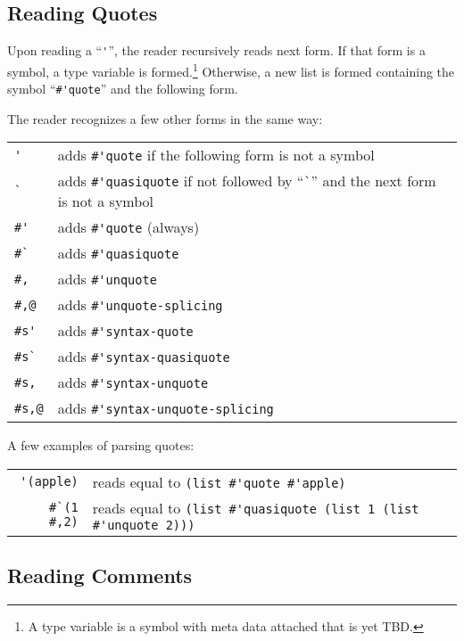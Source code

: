 \subsection{Reading Quotes}
\label{subsec:aml-base-lang-reader-quotes}

Upon reading a ``\lstinline!'!'', the reader recursively reads next form. If that form is a symbol, a type variable is formed.\footnote{A type variable is a symbol with meta data attached that is yet TBD.} Otherwise, a new list is formed containing the symbol ``\lstinline!#'quote!'' and the following form. 

The reader recognizes a few other forms in the same way:

\begin{tabular}{ l l }
  \lstinline!'! & adds \lstinline!#'quote! if the following form is not a symbol \\
  \lstinline!`! & adds \lstinline!#'quasiquote! if not followed by ``\lstinline!`!'' and the next form is not a symbol \\
  \lstinline!#'! & adds \lstinline!#'quote! (always) \\
  \lstinline!#`! & adds \lstinline!#'quasiquote! \\
  \lstinline!#,! & adds \lstinline!#'unquote! \\
  \lstinline!#,@! & adds \lstinline!#'unquote-splicing! \\
  \lstinline!#s'! & adds \lstinline!#'syntax-quote! \\
  \lstinline!#s`! & adds \lstinline!#'syntax-quasiquote! \\
  \lstinline!#s,! & adds \lstinline!#'syntax-unquote! \\
  \lstinline!#s,@! & adds \lstinline!#'syntax-unquote-splicing! \\
\end{tabular}

\example A few examples of parsing quotes:

\begin{tabular}{ r l }
  \lstinline!'(apple)! & reads equal to \lstinline!(list #'quote #'apple)! \\
  \lstinline!#`(1 #,2)! & reads equal to \lstinline!(list #'quasiquote (list 1 (list #'unquote 2)))! \\
\end{tabular}





\subsection{Reading Comments}
\label{subsec:aml-base-lang-reader-comments}

